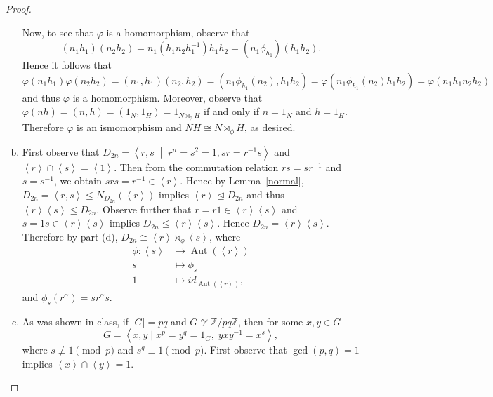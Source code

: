 \documentclass[10pt]{amsart}
\newcommand{\Aut}[1]{\operatorname{Aut}\left(#1\right)}
\newcommand{\abs}[1]{\left| #1 \right|}
\begin{document}
\begin{thm}
\begin{proof}
\begin{enumerate}[(a)]
      Now, to see that $\varphi$ is a homomorphism, observe that 
      $$(n_1h_1)(n_2h_2) = n_1(h_1n_2h_1^{-1})h_1h_2 = (n_1\phi_{h_1})(h_1h_2).$$
      Hence it follows that
      $$\varphi(n_1h_1)\varphi(n_2h_2) = (n_1, h_1)(n_2,h_2) = (n_1\phi_{h_1}(n_2), h_1h_2) = \varphi(n_1\phi_{h_1}(n_2)h_1h_2) = \varphi(n_1h_1n_2h_2)$$
      and thus $\varphi$ is a homomorphism.
      Moreover, observe that $\varphi(nh) = (n,h) = (1_N,1_H) = 1_{N \rtimes_{\phi} H}$ if and only if $n = 1_N$ and $h = 1_H$.
      Therefore $\varphi$ is an ismomorphism and $NH \cong N \rtimes_{\phi} H$, as desired.
    \item
      First observe that $D_{2n} = \left< r, s \;\middle\vert\; r^n = s^2 = 1, sr = r^{-1}s\right>$ and $\left<r\right> \cap \left<s\right> = \left<1\right>$.
      Then from the commutation relation $rs = sr^{-1}$ and $s = s^{-1}$, we obtain $srs = r^{-1} \in \left<r\right>$.
      Hence by Lemma~\ref{normal}, $D_{2n} = \left<r, s\right> \leq N_{D_{2n}}(\left<r\right>)$ implies $\left<r\right> \unlhd D_{2n}$ and thus $\left<r\right>\left<s\right> \leq D_{2n}$.
      Observe further that $r = r1 \in \left<r\right>\left<s\right>$ and $s = 1s \in \left<r\right>\left<s\right>$ implies $D_{2n} \leq \left<r\right>\left<s\right>$.
      Hence $D_{2n} = \left<r\right>\left<s\right>$.
      Therefore by part (d), $D_{2n} \cong \left<r\right> \rtimes_{\phi} \left<s\right>$, where 
      \begin{align*}
        \phi \colon \left<s\right> &\rightarrow \Aut{\left<r\right>}\\
        s &\mapsto \phi_{s}\\ 
        1 &\mapsto id_{\Aut{\left<r\right>}},
      \end{align*}
      and $\phi_{s}(r^\alpha) = s r^\alpha s$.
    \item
      As was shown in class, if $\abs{G} = pq$ and $G \not \cong \mathbb{Z}/pq\mathbb{Z}$, then for some $x,y \in G$
      $$G = \left< x, y \mid x^p = y^q = 1_G,\; yxy^{-1} = x^s\right>,$$
      where $s \not \equiv 1 \pmod{p}$ and $s^q \equiv 1 \pmod{p}$.
      First observe that $\gcd(p,q) = 1$ implies $\left<x\right> \cap \left<y\right> = 1$.

\end{enumerate}
\end{proof}
\end{thm}
\end{document}
